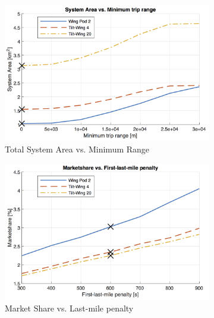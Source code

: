 \begin{figure}[h]
\begin{subfigure}[t]{0.33\textwidth}
    \centering
    \includegraphics[width=\textwidth]{Figures/report_sys_area.png}
    \captionsetup{justification=centering}
    \caption{Total System Area vs. Minimum Range}
    \label{fig:sens1}
\end{subfigure}
\begin{subfigure}[t]{0.33\textwidth}
    \centering
    \includegraphics[width=\textwidth]{Figures/report_marketshare.png}
    \captionsetup{justification=centering}
    \caption{Market Share vs. Last-mile penalty}
    \label{fig:sens2}
\end{subfigure}
\begin{subfigure}[t]{0.33\textwidth}
    \centering

\end{subfigure}
\end{figure}
